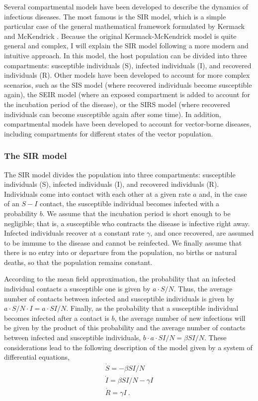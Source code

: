 Several compartmental models have been developed to describe the dynamics of
infectious diseases. The most famous is the SIR model, which is a simple
particular case of the general mathematical framework formulated by Kermack and
McKendrick \cite{McKendrick}. Because the original Kermack-McKendrick model
is quite general and complex, I will explain the SIR model following a more
modern and intuitive approach. In this model, the host population can be
divided into three compartments: susceptible individuals (S), infected
individuals (I), and recovered individuals (R). Other models have been
developed to account for more complex scenarios, such as the SIS model (where
recovered individuals become susceptible again), the SEIR model (where an
exposed compartment is added to account for the incubation period of the
disease), or the SIRS model (where recovered individuals can become susceptible
again after some time). In addition, compartmental models have been developed
to account for vector-borne diseases, including compartments for different
states of the vector population.

\subsubsection*{\label{sec:The SIR model} The SIR model}

The SIR model divides the population into three
compartments: susceptible individuals (S), infected individuals (I), and
recovered individuals (R). Individuals come into contact with each other at a
given rate $a$ and, in the case of an $S-I$ contact, the susceptible individual
becomes infected with a probability $b$. We assume that the incubation period
is short enough to be negligible; that is, a susceptible who contracts the
disease is infective right away. Infected individuals recover at a constant
rate $\gamma$, and once recovered, are assumed to be immune to the disease and
cannot be reinfected. We finally assume that there is no entry into or
departure from the population, no births or natural deaths, so that
the population remains constant.

According to the mean field approximation, the probability that an infected
individual contacts a susceptible one is given by $a\cdot S/N$. Thus, the
average number of contacts between infected and susceptible individuals is
given by $a\cdot S/N\cdot I=a\cdot SI/N$. Finally, as the probability that a
susceptible individual becomes infected after a contact is $b$, the average
number of new infections will be given by the product of this probability and
the average number of contacts between infected and susceptible individuals,
$b\cdot a\cdot SI/N=\beta SI/N$. These considerations lead to the following
description of the model given by a system of differential equations,
\begin{equation}\label{eq: normal_SIR_theo}
  \begin{array}{l}
    \dot{S}=-\beta SI/N          \\
    \dot{I}=\beta SI/N -\gamma I \\
    \dot{R}=\gamma I \ .
  \end{array}
\end{equation}

